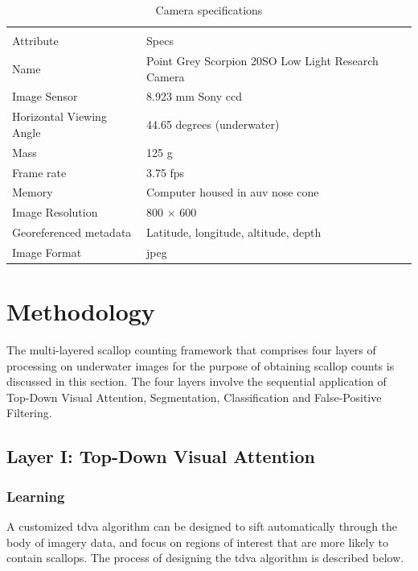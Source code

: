 \documentclass {udthesis}
\begin{document}
%                                                      
\begin{table}                                                     
\centering
\begin{tabularx}{\textwidth}{XX}
\toprule[1pt]\\[-6pt]
Attribute	&Specs\\[2pt]\midrule
Name	&Point Grey Scorpion 20SO Low Light Research Camera\\
Image Sensor	&8.923 mm Sony ccd\\
Horizontal Viewing Angle	&44.65 degrees (underwater)\\
Mass	&125 g\\
Frame rate	&3.75 fps\\
Memory	&Computer housed in \gls{auv} nose cone\\
Image Resolution	&800 $\times$ 600\\
Georeferenced metadata	&Latitude, longitude, altitude, depth\\
Image Format	&jpeg\\[2pt]\bottomrule[1pt]
\end{tabularx}
\caption{Camera specifications\label{tab:camera_specs}}
\end{table}


\section{Methodology}

The multi-layered scallop counting framework that comprises four layers of processing on underwater images for the purpose of obtaining scallop counts is discussed in this section. 
The four layers involve the sequential application of Top-Down Visual Attention, Segmentation, Classification and False-Positive Filtering.

\subsection{Layer I: Top-Down Visual Attention} \label{subsec:TDVA}

\subsubsection{Learning}

A customized \gls{tdva} algorithm can be designed 
to sift automatically through the body of imagery data, and focus on
regions of interest that are more likely to contain scallops.
The process of designing the \gls{tdva} algorithm is described below.
\end{document}
